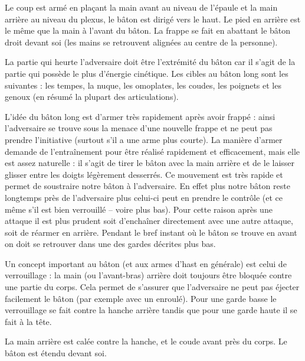 \begin{coup}

Le coup est armé en plaçant la main avant au niveau de l'épaule et la main arrière au niveau du plexus, le bâton est dirigé vers le haut.
Le pied en arrière est le même que la main à l'avant du bâton.
La frappe se fait en abattant le bâton droit devant soi (les mains se retrouvent alignées au centre de la personne).
\end{coup}


La partie qui heurte l'adversaire doit être l'extrémité du bâton car il s'agit de la partie qui possède le plus d'énergie cinétique.
Les cibles au bâton long sont les suivantes : les tempes, la nuque, les omoplates, les coudes, les poignets et les genoux (en résumé la plupart des articulations).

L'idée du bâton long est d'armer très rapidement après avoir frappé : ainsi l'adversaire se trouve sous la menace d'une nouvelle frappe et ne peut pas prendre l'initiative (surtout s'il a une arme plus courte).
La manière d'armer demande de l'entraînement pour être réalisé rapidement et efficacement, mais elle est assez naturelle : il s'agit de tirer le bâton avec la main arrière et de le laisser glisser entre les doigts légèrement desserrés.
Ce mouvement est très rapide et permet de soustraire notre bâton à l'adversaire.
En effet plus notre bâton reste longtemps près de l'adversaire plus celui-ci peut en prendre le contrôle (et ce même s'il est bien verrouillé -- voire plus bas).
Pour cette raison après une attaque il est plus prudent soit d'enchaîner directement avec une autre attaque, soit de réarmer en arrière.
Pendant le bref instant où le bâton se trouve en avant on doit se retrouver dans une des gardes décrites plus bas.



Un concept important au bâton (et aux armes d'hast en générale) est celui de verrouillage : la main (ou l'avant-bras) arrière doit toujours être bloquée contre une partie du corps.
Cela permet de s'assurer que l'adversaire ne peut pas éjecter facilement le bâton (par exemple avec un enroulé).
Pour une garde basse le verrouillage se fait contre la hanche arrière tandis que pour une garde haute il se fait à la tête.


\begin{garde}

La main arrière est calée contre la hanche, et le coude avant près du corps.
Le bâton est étendu devant soi.
\end{garde}


